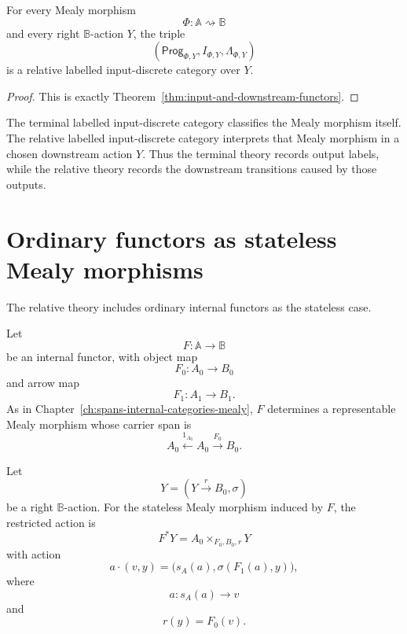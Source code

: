 \begin{proposition}
\label{prop:relative-labelled-input-discrete-interpretation}
For every Mealy morphism
\[
\Phi:\mathbb A\rightsquigarrow\mathbb B
\]
and every right \(\mathbb B\)-action \(Y\), the triple
\[
\left(
\mathsf{Prog}_{\Phi,Y},
I_{\Phi,Y},
\Lambda_{\Phi,Y}
\right)
\]
is a relative labelled input-discrete category over \(Y\).
\end{proposition}

\begin{proof}
This is exactly Theorem~\ref{thm:input-and-downstream-functors}.
\end{proof}

\begin{remark}
\label{rem:terminal-classification-relative-interpretation}
The terminal labelled input-discrete category classifies the Mealy morphism
itself. The relative labelled input-discrete category interprets that Mealy
morphism in a chosen downstream action \(Y\). Thus the terminal theory records
output labels, while the relative theory records the downstream transitions
caused by those outputs.
\end{remark}

\section{Ordinary functors as stateless Mealy morphisms}
\label{sec:ordinary-functors-stateless-mealy}

The relative theory includes ordinary internal functors as the stateless case.

Let
\[
F:\mathbb A\to\mathbb B
\]
be an internal functor, with object map
\[
F_0:A_0\to B_0
\]
and arrow map
\[
F_1:A_1\to B_1.
\]
As in Chapter~\ref{ch:spans-internal-categories-mealy}, \(F\) determines a
representable Mealy morphism whose carrier span is
\[
A_0\xleftarrow{1_{A_0}}A_0\xrightarrow{F_0}B_0.
\]

\begin{proposition}
\label{prop:ordinary-functor-restriction-actions}
Let
\[
Y=(Y\xrightarrow{r}B_0,\sigma)
\]
be a right \(\mathbb B\)-action. For the stateless Mealy morphism induced by
\(F\), the restricted action is
\[
F^\ast Y
=
A_0\times_{F_0,B_0,r}Y
\]
with action
\[
a\cdot(v,y)
=
\bigl(s_A(a),\sigma(F_1(a),y)\bigr),
\]
where
\[
a:s_A(a)\to v
\]
and
\[
r(y)=F_0(v).
\]
\end{proposition}

